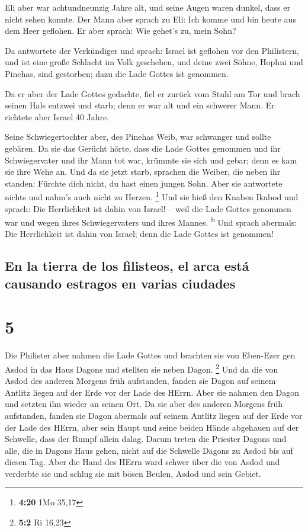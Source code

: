  Eli aber war achtundneunzig Jahre alt, und seine Augen
waren dunkel, dass er nicht sehen konnte.  Der Mann aber
sprach zu Eli: Ich komme und bin heute aus dem Heer geflohen. Er aber
sprach: Wie gehet's zu, mein Sohn?

 Da antwortete der Verkündiger und sprach: Israel ist
geflohen vor den Philistern, und ist eine große Schlacht im Volk
geschehen, und deine zwei Söhne, Hophni und Pinehas, sind gestorben;
dazu die Lade Gottes ist genommen.

 Da er aber der Lade Gottes gedachte, fiel er zurück vom
Stuhl am Tor und brach seinen Hals entzwei und starb; denn er war alt
und ein schwerer Mann. Er richtete aber Israel 40 Jahre.

 Seine Schwiegertochter aber, des Pinehas Weib, war
schwanger und sollte gebären. Da sie das Gerücht hörte, dass die Lade
Gottes genommen und ihr Schwiegervater und ihr Mann tot war, krümmte sie
sich und gebar; denn es kam sie ihre Wehe an.  Und da sie
jetzt starb, sprachen die Weiber, die neben ihr standen: Fürchte dich
nicht, du hast einen jungen Sohn. Aber sie antwortete nichts und nahm's
auch nicht zu Herzen. \footnote{\textbf{4:20} 1Mo 35,17} 
Und sie hieß den Knaben Ikabod und sprach: Die Herrlichkeit ist dahin
von Israel! -- weil die Lade Gottes genommen war und wegen ihres
Schwiegervaters und ihres Mannes. \textsuperscript{b} 
Und sprach abermals: Die Herrlichkeit ist dahin von Israel; denn die
Lade Gottes ist genommen!

\hypertarget{en-la-tierra-de-los-filisteos-el-arca-estuxe1-causando-estragos-en-varias-ciudades}{%
\subsection{En la tierra de los filisteos, el arca está causando
estragos en varias
ciudades}\label{en-la-tierra-de-los-filisteos-el-arca-estuxe1-causando-estragos-en-varias-ciudades}}

\hypertarget{section-4}{%
\section{5}\label{section-4}}

 Die Philister aber nahmen die Lade Gottes und brachten
sie von Eben-Ezer gen Asdod  in das Haus Dagons und
stellten sie neben Dagon. \footnote{\textbf{5:2} Ri 16,23}
 Und da die von Asdod des anderen Morgens früh aufstanden,
fanden sie Dagon auf seinem Antlitz liegen auf der Erde vor der Lade des
HErrn. Aber sie nahmen den Dagon und setzten ihn wieder an seinen Ort.
 Da sie aber des anderen Morgens früh aufstanden, fanden
sie Dagon abermals auf seinem Antlitz liegen auf der Erde vor der Lade
des HErrn, aber sein Haupt und seine beiden Hände abgehauen auf der
Schwelle, dass der Rumpf allein dalag.  Darum treten die
Priester Dagons und alle, die in Dagons Haus gehen, nicht auf die
Schwelle Dagons zu Asdod bis auf diesen Tag.  Aber die
Hand des HErrn ward schwer über die von Asdod und verderbte sie und
schlug sie mit bösen Beulen, Asdod und sein Gebiet.

